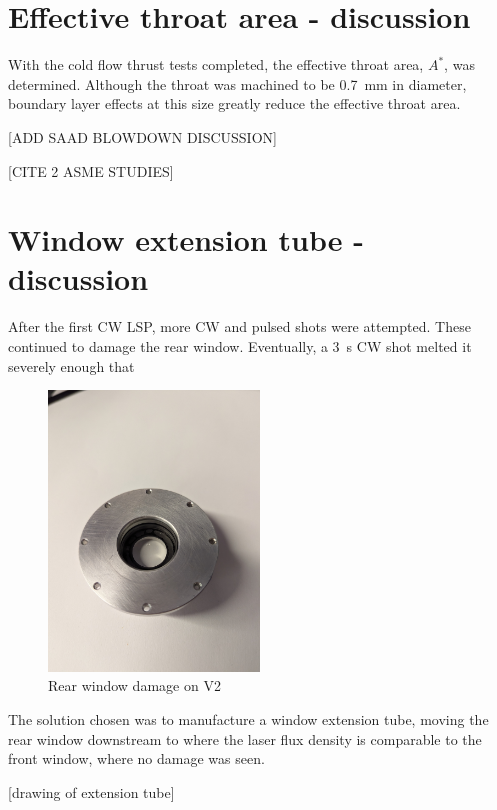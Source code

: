     \section{Effective throat area - discussion}
            
        With the cold flow thrust tests completed, the effective throat area, $A^*$, was determined. Although the throat was machined to be \qty{0.7}{mm} in diameter, boundary layer effects at this size greatly reduce the effective throat area.

        [ADD SAAD BLOWDOWN DISCUSSION]

        [CITE 2 ASME STUDIES]

    \section{Window extension tube - discussion}
        
        After the first CW LSP, more CW and pulsed shots were attempted. These continued to damage the rear window. Eventually, a \qty{3}{s} CW shot melted it severely enough that 

        \begin{figure}[!ht]
            \centering
            \includegraphics[width=0.5\textwidth]{assets/4 experiments/window damage.jpg}
            \caption{Rear window damage on V2}
        \end{figure}

        The solution chosen was to manufacture a window extension tube, moving the rear window downstream to where the laser flux density is comparable to the front window, where no damage was seen.

        [drawing of extension tube]
